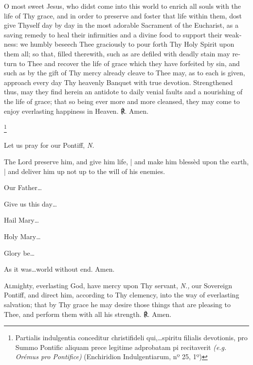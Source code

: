 \documentclass[11pt]{book}
\begin{document}

\begin{otherlanguage}{english}{\par}\end{otherlanguage}

\begin{otherlanguage}{english}

\lettrine{O}{} most sweet Jesus, who didst come into this world to enrich all souls with the life of Thy grace, and in order to preserve and foster that life within them, dost give Thyself day by day in the most adorable Sacrament of the Eucharist, as a saving remedy to heal their infirmities and a divine food to support their weakness: we humbly beseech Thee graciously to pour forth Thy Holy Spirit upon them all; so that, filled therewith, such as are defiled with deadly stain may return to Thee and recover the life of grace which they have forfeited by sin, and such as by the gift of Thy mercy already cleave to Thee may, as to each is given, approach every day Thy heavenly Banquet with true devotion. Strengthened thus, may they find herein an antidote to daily venial faults and a nourishing of the life of grace; that so being ever more and more cleansed, they may come to enjoy everlasting happiness in Heaven. ℟. Amen.

\footnote{\raggedright{Partialis indulgentia conceditur christifideli qui,…spiritu filialis devotionis, pro Summo Pontific aliquam prece legitime adprobatam pi recitaverit \textit{(e.g. Orémus pro Pontifice)} (Enchiridion Indulgentiarum, nº 25, 1º)}}

\noindent \vv Let us pray for our Pontiff, \textit{N.}

\noindent \rr The Lord preserve him, and give him life, | and make him blessèd upon the earth, | and deliver him up not up to the will of his enemies.

\noindent \vv Our Father…

\noindent \rr Give us this day…

\noindent \vv Hail Mary…

\noindent \rr Holy Mary…

\noindent \vv  Glory be…

\noindent \rr As it was…world without end. Amen.


\lettrine{A}{l}mighty, everlasting God, have mercy upon Thy servant, \textit{N.,} our Sovereign Pontiff, and direct him, according to Thy clemency, into the way of everlasting salvation; that by Thy grace he may desire those things that are pleasing to Thee, and perform them with all his strength. ℟. Amen.


\end{otherlanguage}
\end{document}
